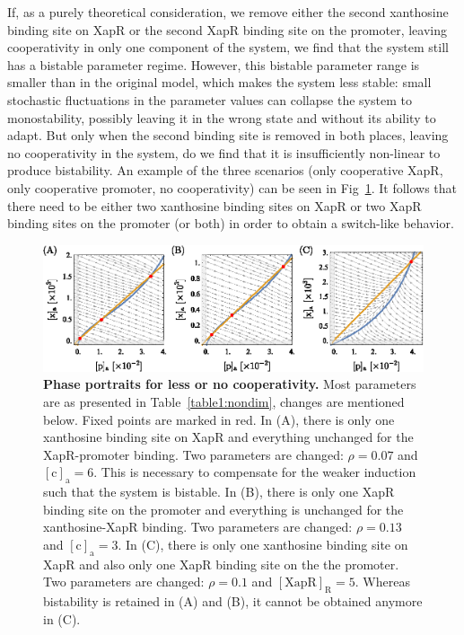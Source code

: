 \documentclass[10pt,letterpaper]{article}
\newcommand{\n}[1]{\mathrm{#1}}
\begin{document}
	If, as a purely theoretical consideration, we remove either the second
	xanthosine binding site on XapR or the second XapR binding site on the
	promoter, leaving cooperativity in only one component of the system,
	we find that the system still has a bistable parameter regime.
	However, this bistable parameter range is smaller than in the original
	model, which makes the system less stable: small stochastic fluctuations
	in the parameter values can collapse the system to monostability,
	possibly leaving it in the wrong state and without its ability to adapt.
	But only when the second binding site is removed in both places, leaving
	no cooperativity in the system, do we find that it is insufficiently non-linear to produce bistability. An example
	of the three scenarios (only cooperative XapR, only cooperative promoter, no cooperativity) can be seen in Fig~\ref{fig7:coop}. It follows that
	there need to be either two xanthosine binding sites on XapR or two XapR
	binding sites on the promoter (or both) in order to obtain a switch-like
	behavior. 
	
	\begin{figure}%
		\centering
		\includegraphics{media/Fig7_coop.eps}
		\caption{{\bf Phase portraits for less or no cooperativity.}
			Most parameters are as presented in Table~\ref{table1:nondim},
			changes are mentioned below. Fixed points are marked in red. In (A),
			there is only one xanthosine binding site on XapR and everything
			unchanged for the XapR-promoter binding. Two parameters are changed:
			$\rho = 0.07$ and $\n{[c]_a} = 6$. This is necessary to compensate
			for the weaker induction such that the system is bistable. In (B),
			there is only one XapR binding site on the promoter and everything
			is unchanged for the xanthosine-XapR binding. Two parameters are
			changed: $\rho = 0.13$ and $\n{[c]_a} = 3$. In (C), there is only
			one xanthosine binding site on XapR and also only one XapR binding
			site on the the promoter. Two parameters are changed: $\rho = 0.1$
			and $\n{[XapR]_R} = 5$. Whereas bistability is retained in (A) and
			(B), it cannot be obtained anymore in (C).}
		\label{fig7:coop}
	\end{figure}
	
\end{document}
